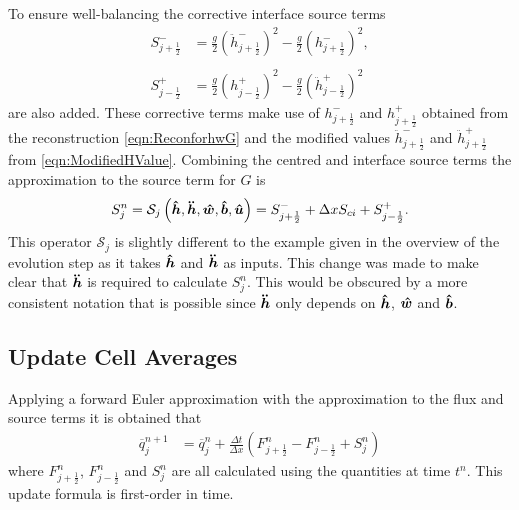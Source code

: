 To ensure well-balancing the corrective interface source terms
	\begin{align*}
	 S^{-}_{j + \frac{1}{2}} &=  \frac{g}{2} \left(\ddot{h}^{-}_{j + \frac{1}{2}} \right)^2 - \frac{g}{2} \left(h^{-}_{j + \frac{1}{2}} \right)^2, \\ \\
	  S^{+}_{j - \frac{1}{2}} &=  \frac{g}{2} \left(h^{+}_{j - \frac{1}{2}}\right)^2 - \frac{g}{2}\left(\ddot{h}^{+}_{j - \frac{1}{2}}\right)^2 
	\end{align*}
are also added. These corrective terms make use of $h^{-}_{j + \frac{1}{2}}$ and $h^{+}_{j + \frac{1}{2}}$ obtained from the reconstruction \eqref{eqn:ReconforhwG} and the modified values $\ddot{h}^{-}_{j + \frac{1}{2}}$ and $\ddot{h}^{+}_{j + \frac{1}{2}}$ from \eqref{eqn:ModifiedHValue}. Combining the centred and interface source terms the approximation to the source term for $G$ is 
\begin{equation*}
S^n_j = \mathcal{S}_j\left( \boldsymbol{\hat{h}},\boldsymbol{\ddot{h}},\boldsymbol{\hat{w}},\boldsymbol{\hat{b}}, \boldsymbol{\hat{u}}  \right)=   S^{-}_{j + \frac{1}{2}} + \Delta x S_{ci} + S^{+}_{j - \frac{1}{2}}.
\end{equation*}
This operator $\mathcal{S}_j$ is slightly different to the example given in the overview of the evolution step as it takes $\boldsymbol{\hat{h}}$ and $\boldsymbol{\ddot{h}}$ as inputs. This change was made to make clear that $\boldsymbol{\ddot{h}}$ is required to calculate $S^n_j$. This would be obscured by a more consistent notation that is possible since $\boldsymbol{\ddot{h}}$ only depends on $\boldsymbol{\hat{h}}$, $\boldsymbol{\hat{w}}$ and $\boldsymbol{\hat{b}}$. 


\subsection{Update Cell Averages}
Applying a forward Euler approximation with the approximation to the flux and source terms it is obtained that
\begin{align}
\overline{q}^{n+1}_j &= \overline{q}^{n}_j + \frac{\Delta t}{\Delta x} \left(F^n_{j+\frac{1}{2}} - F^n_{j-\frac{1}{2}} + S^n_j\right)
\label{eqn:UpdateMethod}
\end{align}
where $F^n_{j+\frac{1}{2}}$, $F^n_{j-\frac{1}{2}}$ and $S^n_j$ are all calculated using the quantities at time $t^n$. This update formula is first-order in time.


